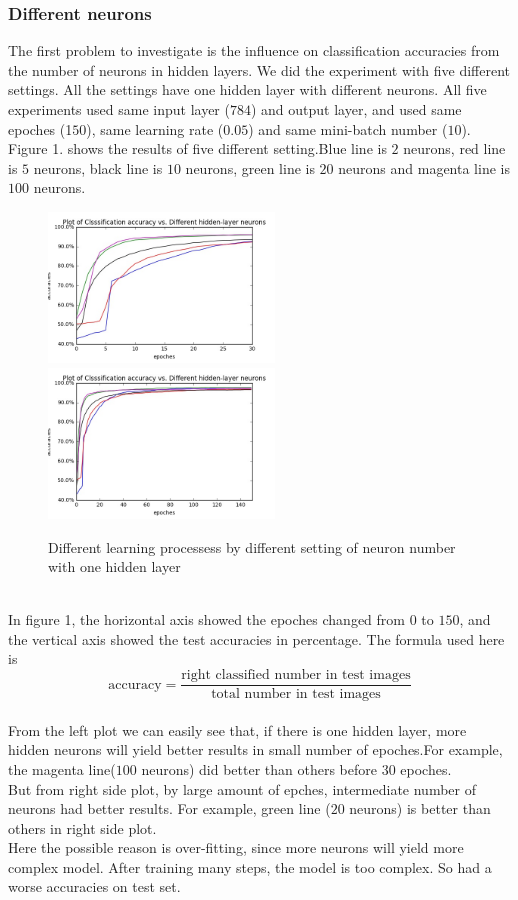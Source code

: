 \documentclass[12pt,a4paper]{article}
\begin{document}
\subsubsection{Different neurons}
The first problem to investigate is the influence on classification accuracies from the number of neurons in hidden layers. We did the experiment with five different settings. All the settings have one hidden layer with different neurons. All five experiments used same input layer ($784$) and output layer, and used same epoches (1$50$), same learning rate ($0.05$) and same mini-batch number ($10$). Figure 1. shows the results of five different setting.Blue line is $2$ neurons, red line is $5$ neurons, black line is $10$ neurons, green line is $20$ neurons and magenta line is $100$ neurons.\\
\begin{figure}
\centering
\includegraphics[width=60mm,scale=1]{p106.jpg}
\includegraphics[width=60mm,scale=1]{p101.jpg}
\caption{Different learning processess by different setting of neuron number with one hidden layer}
\end{figure}\\
In figure 1, the horizontal axis showed the epoches changed from $0$ to $150$, and the vertical axis showed the test accuracies in percentage. The formula used here is
\[\text{accuracy} = \frac{\text{right classified number in test images}}{ \text{total number in test images}}\]\\

From the left plot we can easily see that, if there is one hidden layer, more hidden neurons will yield better results in small number of epoches.For example, the magenta line($100$ neurons) did better than others before $30$ epoches. \\
But from right side plot, by large amount of epches, intermediate number of neurons had better results. For example, green line ($20$ neurons) is better than others in right side plot.\\
Here the possible reason is over-fitting, since more neurons will yield more complex model. After training many steps, the model is too complex. So had a worse accuracies on test set.\\
\end{document}
